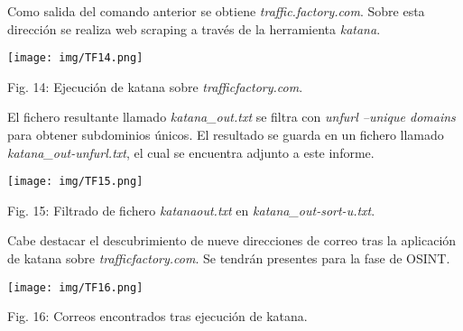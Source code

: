\documentclass[12pt,oneside,a4paper]{book}
\begin{document}
\hspace{20pt}
Como salida del comando anterior se obtiene \textit{traffic.factory.com}. Sobre esta dirección se realiza web scraping  a través de la herramienta \textit{katana}. 

\vspace{2em}

\begin{center}
	\texttt{[image: img/TF14.png]}
    
\vspace{0.1em}
    
    Fig. 14: Ejecución de katana sobre \textit{trafficfactory.com}.
\end{center}

\vspace{2em}

\hspace{20pt}
El fichero resultante llamado \textit{katana\_out.txt} se filtra con \textit{unfurl --unique domains} para obtener subdominios únicos. El resultado se guarda en un fichero llamado \textit{katana\_out-unfurl.txt}, el cual se encuentra adjunto a este informe.

\vspace{2em}

\begin{center}
	\texttt{[image: img/TF15.png]}
    
\vspace{0.1em}
    
    Fig. 15: Filtrado de fichero \textit{katana\-out.txt} en \textit{katana\_out-sort-u.txt}.
\end{center}

\vspace{2em}

\hspace{20pt}
Cabe destacar el descubrimiento de nueve direcciones de correo tras la aplicación de katana sobre \textit{trafficfactory.com}. Se tendrán presentes para la fase de OSINT.

\vspace{2em}

\begin{center}
	\texttt{[image: img/TF16.png]}
    
\vspace{0.1em}
    
    Fig. 16: Correos encontrados tras ejecución de katana.
\end{center}

\vspace{2em}
\end{document}
